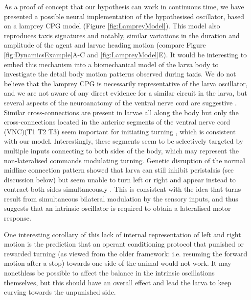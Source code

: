 \documentclass[11pt,a4paper]{article}
\newcommand{\todoBW}[1]{\todo[author=BW,color=orange, size=\tiny,inline]{#1}}
\begin{document}
As a proof of concept that our hypothesis can work in continuous time, we have presented a possible neural implementation of the hypothesised oscillator, based on a lamprey CPG model (Figure \ref{fig:LampreyModel}).
 This model also reproduces taxis signatures and notably, similar variations in the duration and amplitude of the agent and larvae heading motion (compare Figure \ref{fig:DynamicsExample}A-C and \ref{fig:LampreyModel}E). It would be interesting to embed this mechanism into a biomechanical model of the larva body to investigate the detail body motion patterns observed during taxis. 
  We do not believe that the lamprey CPG is necessarily representative of the larva oscillator, and we are not aware of any direct evidence for a similar circuit in the larva, but several aspects of the neuroanatomy of the ventral nerve cord are suggestive \citep{kohsaka2012development}. Similar cross-connections are present in larvae all along the body \citep{rickert2011morphological} but only the cross-connections located in the anterior segments of the ventral nerve cord (VNC)(T1 T2 T3) seem important for initiating turning \citep{ berni2015genetic}, which is consistent with our model. Interestingly, these segments seem to be selectively targeted by multiple inputs connecting to both sides of the body, which may represent the non-lateralised commands modulating turning. Genetic disruption of the normal midline connection pattern showed that larva can still inhibit peristalsis (see discussion below) but seem unable to turn left or right and appear instead to contract both sides simultaneously \citep{berni2015genetic}. This is consistent with the idea that turns result from simultaneous bilateral modulation by the sensory inputs, and thus suggests that an intrinsic oscillator is required to obtain a lateralised motor response.
  
  
  One interesting corollary of this lack of internal representation of left and right motion is the prediction that an operant conditioning protocol that punished or rewarded turning (as viewed from the older framework: i.e. resuming the forward motion after a stop) towards one side of the animal would not work. It may nonethless be possible to affect the balance in the intrinsic oscillations themselves, but this should have an overall effect and lead the larva to keep curving towards the unpunished side.  
\end{document}
